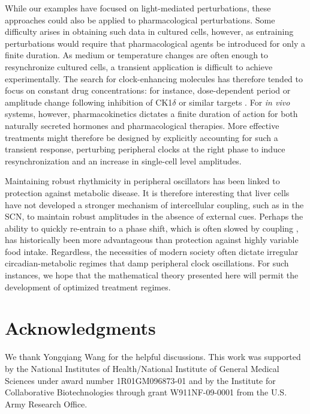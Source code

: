 \documentclass[11pt, letterpaper]{article}
\begin{document}
While our examples have focused on light-mediated perturbations, these approaches could also be applied to pharmacological perturbations.
Some difficulty arises in obtaining such data in cultured cells, however, as entraining perturbations would require that pharmacological agents be introduced for only a finite duration.
As medium or temperature changes are often enough to resynchronize cultured cells, a transient application is difficult to achieve experimentally.
The search for clock-enhancing molecules has therefore tended to focus on constant drug concentrations: for instance, dose-dependent period or amplitude change following inhibition of CK1$\delta$ or similar targets \cite{Chen2013}.
For {\itshape in vivo} systems, however, pharmacokinetics dictates a finite duration of action for both naturally secreted hormones and pharmacological therapies.
More effective treatments might therefore be designed by explicitly accounting for such a transient response, perturbing peripheral clocks at the right phase to induce resynchronization and an increase in single-cell level amplitudes.

Maintaining robust rhythmicity in peripheral oscillators has been linked to protection against metabolic disease.
It is therefore interesting that liver cells have not developed a stronger mechanism of intercellular coupling, such as in the SCN, to maintain robust amplitudes in the absence of external cues.
Perhaps the ability to quickly re-entrain to a phase shift, which is often slowed by coupling \cite{Abraham2010}, has historically been more advantageous than protection against highly variable food intake.
Regardless, the necessities of modern society often dictate irregular circadian-metabolic regimes that damp peripheral clock oscillations.
For such instances, we hope that the mathematical theory presented here will permit the development of optimized treatment regimes.

\section*{Acknowledgments}
We thank Yongqiang Wang for the helpful discussions.
This work was supported by the National Institutes of Health/National Institute of General Medical Sciences under award number 1R01GM096873-01 and by the Institute for Collaborative Biotechnologies through grant W911NF-09-0001 from the U.S.
Army Research Office.




\end{document}
